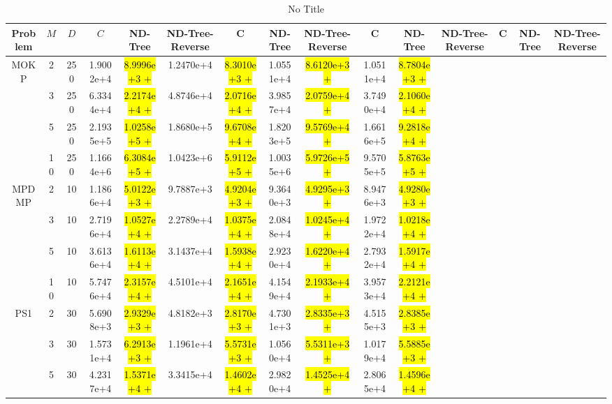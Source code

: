 \documentclass[journal]{IEEEtran}
\begin{document}
\begin{table*}[htbp]
\renewcommand{\arraystretch}{1.2}
\centering
\caption{No Title}
\begin{tabular}{ccccccccccccccc}
\toprule
Problem&$M$&$D$&$C$&ND-Tree&ND-Tree-Reverse&C&ND-Tree&ND-Tree-Reverse&C&ND-Tree&ND-Tree-Reverse&C&ND-Tree&ND-Tree-Reverse\\
\midrule
\multirow{4}{*}{MOKP} & 2&250&1.9002e+4&\hl{8.9996e+3 $+$}&1.2470e+4&\hl{8.3010e+3 $+$}&1.0551e+4&\hl{8.6120e+3 $+$}&1.0511e+4&\hl{8.7804e+3 $+$}}\\
                      & 3&250&6.3344e+4&\hl{2.2174e+4 $+$}&4.8746e+4&\hl{2.0716e+4 $+$}&3.9857e+4&\hl{2.0759e+4 $+$}&3.7490e+4&\hl{2.1060e+4 $+$}}\\
                      & 5&250&2.1935e+5&\hl{1.0258e+5 $+$}&1.8680e+5&\hl{9.6708e+4 $+$}&1.8203e+5&\hl{9.5769e+4 $+$}&1.6616e+5&\hl{9.2818e+4 $+$}}\\
                      &10&250&1.1664e+6&\hl{6.3084e+5 $+$}&1.0423e+6&\hl{5.9112e+5 $+$}&1.0035e+6&\hl{5.9726e+5 $+$}&9.5705e+5&\hl{5.8763e+5 $+$}}\\
\hline                                                                                                                                              
\multirow{4}{*}{MPDMP}& 2& 10&1.1866e+4&\hl{5.0122e+3 $+$}&9.7887e+3&\hl{4.9204e+3 $+$}&9.3640e+3&\hl{4.9295e+3 $+$}&8.9476e+3&\hl{4.9280e+3 $+$}}\\
                      & 3& 10&2.7196e+4&\hl{1.0527e+4 $+$}&2.2789e+4&\hl{1.0375e+4 $+$}&2.0848e+4&\hl{1.0245e+4 $+$}&1.9722e+4&\hl{1.0218e+4 $+$}}\\
                      & 5& 10&3.6136e+4&\hl{1.6113e+4 $+$}&3.1437e+4&\hl{1.5938e+4 $+$}&2.9230e+4&\hl{1.6220e+4 $+$}&2.7932e+4&\hl{1.5917e+4 $+$}}\\
                      &10& 10&5.7476e+4&\hl{2.3157e+4 $+$}&4.5101e+4&\hl{2.1651e+4 $+$}&4.1549e+4&\hl{2.1933e+4 $+$}&3.9573e+4&\hl{2.2121e+4 $+$}}\\
\hline                                                                                                                                              
\multirow{4}{*}{PS1}  & 2& 30&5.6908e+3&\hl{2.9329e+3 $+$}&4.8182e+3&\hl{2.8170e+3 $+$}&4.7301e+3&\hl{2.8335e+3 $+$}&4.5155e+3&\hl{2.8385e+3 $+$}}\\
                      & 3& 30&1.5731e+4&\hl{6.2913e+3 $+$}&1.1961e+4&\hl{5.5731e+3 $+$}&1.0560e+4&\hl{5.5311e+3 $+$}&1.0179e+4&\hl{5.5885e+3 $+$}}\\
                      & 5& 30&4.2317e+4&\hl{1.5371e+4 $+$}&3.3415e+4&\hl{1.4602e+4 $+$}&2.9820e+4&\hl{1.4525e+4 $+$}&2.8065e+4&\hl{1.4596e+4 $+$}}\\

\end{tabular}
\end{table*}
\end{document}
